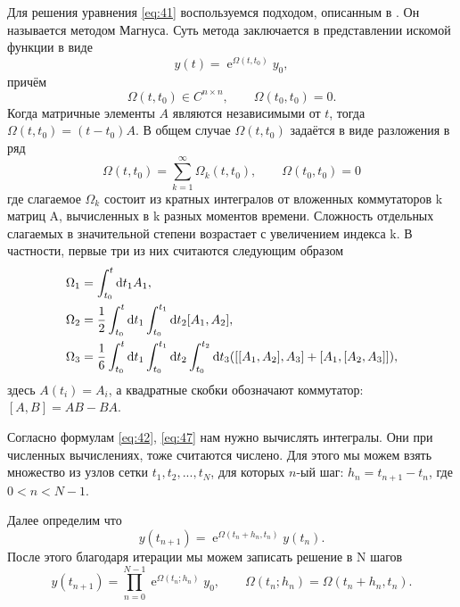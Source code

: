 \documentclass[a4paper,12pt]{article}
\newcommand{\dd}{\mathrm{d}}
\renewcommand{\exp}{\operatorname{e}}
\begin{document}
Для решения уравнения \eqref{eq:41} воспользуемся подходом, описанным в \cite{Casas:2016asi, shay, ped}. Он называется методом Магнуса. Суть метода заключается в представлении искомой функции в виде
	\begin{equation}\label{eq:42}
		y(t)=\exp^{\Omega(t,t_0)}y_0,
	\end{equation}
 	причём
	\begin{equation}\label{eq:48}
		\Omega(t,t_0)\in C^{n \times n},\qquad \Omega(t_0,t_0)=0.
	\end{equation}
	Когда матричные элементы \(A\) являются независимыми от \(t\), тогда \(\Omega(t,t_0)=(t-t_0)A\). В общем случае \(\Omega(t,t_0)\) задаётся в виде разложения в ряд
	\begin{equation}\label{eq:44}
		\Omega(t,t_0)=\sum_{k=1}^{\infty}\Omega_{k}(t,t_0),\qquad \Omega(t_0,t_0)=0
	\end{equation}
	где слагаемое \(\Omega_{k}\) состоит из кратных интегралов от вложенных коммутаторов k матриц A, вычисленных в k разных моментов времени. Сложность отдельных слагаемых в значительной степени возрастает с увеличением индекса k. В частности, первые три из них считаются следующим образом
	\begin{equation}\label{eq:47}
		\begin{lgathered}
			\Omega_{1}=\int_{t_0}^{t}\dd t_1 A_1,\\
			\Omega_{2}=\frac{1}{2}\int_{t_0}^{t}\dd t_1 \int_{t_0}^{t_1}\dd t_2[ A_1,A_2],\\
			\Omega_{3}=\frac{1}{6}\int_{t_0}^{t}\dd t_1 \int_{t_0}^{t_1}\dd t_2 \int_{t_0}^{t_2}\dd t_3([[ A_1,A_2],A_3]+[A_1,[ A_2,A_3]]),\\
		\end{lgathered}
	\end{equation}
	здесь \(A(t_i)=A_i\), а квадратные скобки обозначают коммутатор: \([A,B]=AB-BA\).

	Согласно формулам \eqref{eq:42}, \eqref{eq:47} нам нужно вычислять интегралы. Они при численных вычислениях, тоже считаются числено. Для этого мы можем взять множество из узлов сетки \(t_1,t_2,...,t_N\), для которых \(n\)-ый шаг: \(h_n=t_{n+1}-t_n\), где \(0<n<N-1\).

	Далее определим что
	\begin{equation}\label{eq:45}
		y(t_{n+1})=\exp^{\Omega(t_n+h_n,t_n)}y(t_n).
	\end{equation}
	После этого благодаря  итерации мы можем записать решение в N шагов
	\begin{equation}\label{eq:43}
		y(t_{n+1})=\prod_{n=0}^{N-1} \exp^{\Omega(t_n;h_n)}y_0,\qquad \Omega(t_n;h_n)=\Omega(t_n+h_n,t_n).
	\end{equation}
\end{document}
